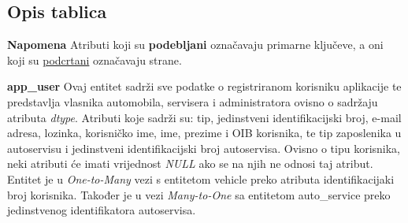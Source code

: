 		
		
			\subsection{Opis tablica}
			

				
				{\small \textbf{Napomena} Atributi koji su \textbf{podebljani} označavaju primarne ključeve, a oni koji su \underline{podcrtani} označavaju strane.}
				
				\noindent\textbf{app\_user} Ovaj entitet sadrži sve podatke o registriranom korisniku aplikacije te predstavlja vlasnika automobila, servisera i administratora ovisno o sadržaju atributa \textit{dtype}. Atributi koje sadrži su: tip, jedinstveni identifikacijski broj, e-mail adresa, lozinka, korisničko ime, ime, prezime i OIB korisnika, te tip zaposlenika u autoservisu i jedinstveni identifikacijski broj autoservisa. Ovisno o tipu korisnika, neki atributi će imati vrijednost \textit{NULL} ako se na njih ne odnosi taj atribut. Entitet je u \textit{One-to-Many} vezi s entitetom vehicle preko atributa identifikacijaki broj korisnika. Također je u vezi \textit{Many-to-One} sa entitetom auto\_service preko jedinstvenog identifikatora autoservisa.
				
